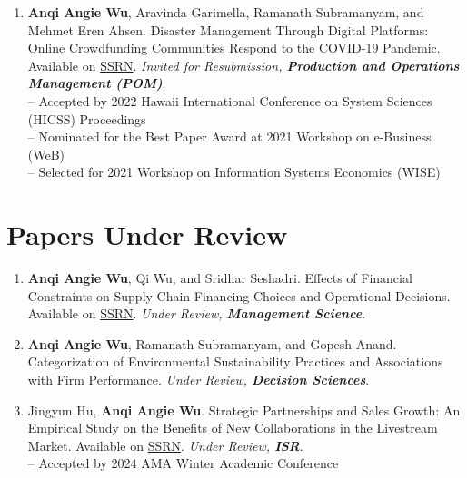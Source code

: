 \documentclass[margin,line]{resume}
\begin{document}
\begin{resume}
\begin{enumerate}[topsep=0pt, leftmargin=*]
         \item \textbf{Anqi Angie Wu}, Aravinda Garimella, Ramanath Subramanyam, and Mehmet Eren Ahsen. Disaster Management Through Digital Platforms: Online Crowdfunding Communities Respond to the COVID-19 Pandemic. Available on \href{https://papers.ssrn.com/abstract=3779438}{{SSRN}}. \textit{Invited for Resubmission, \textbf{Production and Operations Management (POM)}}. \\ 	     [0.3em]
         -- Accepted by 2022 Hawaii International Conference on System Sciences (HICSS) Proceedings\\
         -- Nominated for the Best Paper Award at 2021 Workshop on e-Business (WeB)\\
         -- Selected for 2021 Workshop on Information Systems Economics (WISE)


 	  \end{enumerate}   

\section{\mysidestyle Papers Under Review}  	  \begin{enumerate}[topsep=0pt, leftmargin=*] 

       \item \textbf{Anqi Angie Wu}, Qi Wu, and Sridhar Seshadri. Effects of Financial Constraints on Supply Chain Financing Choices and Operational Decisions. Available on \href{https://ssrn.com/abstract=4603080}{{SSRN}}. \textit{Under Review, \textbf{Management Science}}.\\[-0.5em]


       \item \textbf{Anqi Angie Wu}, Ramanath Subramanyam, and Gopesh Anand. 
       Categorization of Environmental Sustainability Practices and Associations with Firm Performance. \textit{Under Review, \textbf{Decision Sciences}}. \\[-0.5em]
        
    \newpage  

           \item Jingyun Hu, \textbf{Anqi Angie Wu}. Strategic Partnerships and Sales Growth: An Empirical Study on the Benefits of New Collaborations in the Livestream Market. Available on \href{https://papers.ssrn.com/abstract=4656779}{{SSRN}}. \textit{Under Review, \textbf{ISR}}.\\[0.3em]
       -- Accepted by 2024 AMA Winter Academic Conference
\end{enumerate} 


\end{resume}
\end{document}
